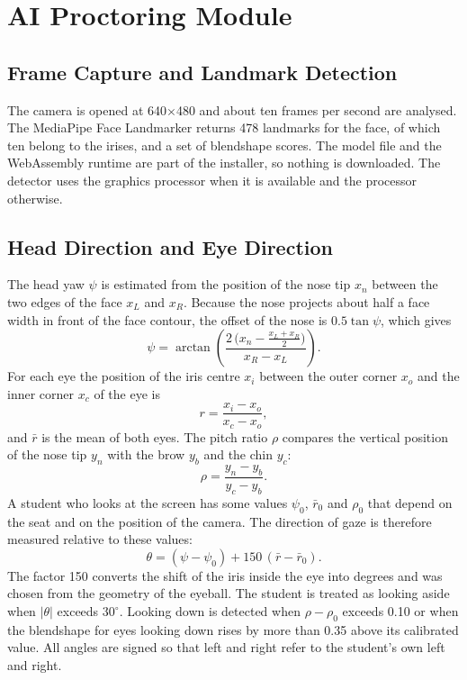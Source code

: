 \documentclass[12pt,a4paper]{report}
\begin{document}
\section{AI Proctoring Module}

\subsection{Frame Capture and Landmark Detection}
The camera is opened at 640$\times$480 and about ten frames per second are analysed. The MediaPipe Face Landmarker returns 478 landmarks for the face, of which ten belong to the irises, and a set of blendshape scores. The model file and the WebAssembly runtime are part of the installer, so nothing is downloaded. The detector uses the graphics processor when it is available and the processor otherwise.

\subsection{Head Direction and Eye Direction}
The head yaw $\psi$ is estimated from the position of the nose tip $x_n$ between the two edges of the face $x_L$ and $x_R$. Because the nose projects about half a face width in front of the face contour, the offset of the nose is $0.5\tan\psi$, which gives
\begin{equation}
\psi = \arctan\!\left(\frac{2\,\bigl(x_n-\tfrac{x_L+x_R}{2}\bigr)}{x_R-x_L}\right).
\end{equation}
For each eye the position of the iris centre $x_i$ between the outer corner $x_o$ and the inner corner $x_c$ of the eye is
\begin{equation}
r = \frac{x_i-x_o}{x_c-x_o},
\end{equation}
and $\bar r$ is the mean of both eyes. The pitch ratio $\rho$ compares the vertical position of the nose tip $y_n$ with the brow $y_b$ and the chin $y_c$:
\begin{equation}
\rho = \frac{y_n-y_b}{y_c-y_b}.
\end{equation}
A student who looks at the screen has some values $\psi_0$, $\bar r_0$ and $\rho_0$ that depend on the seat and on the position of the camera. The direction of gaze is therefore measured relative to these values:
\begin{equation}
\theta = (\psi-\psi_0) + 150\,(\bar r-\bar r_0).
\end{equation}
The factor 150 converts the shift of the iris inside the eye into degrees and was chosen from the geometry of the eyeball. The student is treated as looking aside when $|\theta|$ exceeds $30^\circ$. Looking down is detected when $\rho-\rho_0$ exceeds 0.10 or when the blendshape for eyes looking down rises by more than 0.35 above its calibrated value. All angles are signed so that left and right refer to the student's own left and right.
\end{document}
